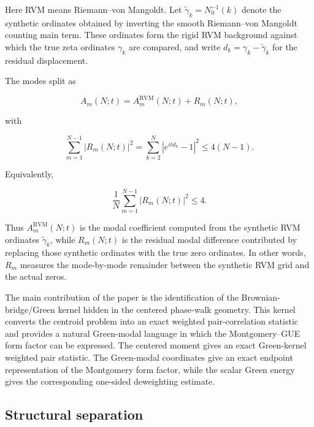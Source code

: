 \documentclass[11pt]{amsart}
\numberwithin{equation}{section}
\theoremstyle{plain}
\theoremstyle{definition}
\theoremstyle{remark}
\begin{document}
Here RVM means Riemann--von Mangoldt. Let
\(\widetilde\gamma_k=N_0^{-1}(k)\) denote the synthetic ordinates
obtained by inverting the smooth Riemann--von Mangoldt counting main
term. These ordinates form the rigid RVM background against which the
true zeta ordinates \(\gamma_k\) are compared, and write
\(d_k=\gamma_k-\widetilde\gamma_k\) for the residual displacement.

The modes split as

\begin{equation}
A_m(N;t)=A_m^{\mathrm{RVM}}(N;t)+R_m(N;t),
\label{eq:conclusion_rvm_modal_split}
\end{equation}

with

\begin{equation}
\sum_{m=1}^{N-1}|R_m(N;t)|^2
=
\sum_{k=2}^{N}|e^{itd_k}-1|^2
\le
4(N-1).
\label{eq:conclusion_rvm_residual_bound}
\end{equation}

Equivalently,

\begin{equation}
\frac1N
\sum_{m=1}^{N-1}|R_m(N;t)|^2
\le
4.
\label{eq:conclusion_rvm_residual_normalized_bound}
\end{equation}

Thus \(A_m^{\mathrm{RVM}}(N;t)\) is the modal coefficient computed from
the synthetic RVM ordinates \(\widetilde\gamma_k\), while \(R_m(N;t)\) is
the residual modal difference contributed by replacing those synthetic
ordinates with the true zero ordinates. In other words, \(R_m\) measures
the mode-by-mode remainder between the synthetic RVM grid and the actual
zeros.

The main contribution of the paper is the identification of the
Brownian-bridge/Green kernel hidden in the centered phase-walk geometry.
This kernel converts the centroid problem into an exact weighted
pair-correlation statistic and provides a natural Green-modal language
in which the Montgomery--GUE form factor can be expressed.
The centered moment gives an exact Green-kernel weighted pair statistic.
The Green-modal coordinates give an exact endpoint representation of the
Montgomery form factor, while the scalar Green energy gives the
corresponding one-sided deweighting estimate.

\subsection{Structural separation}
\label{subsec:conclusion_structural_separation}
\leavevmode\par\nobreak
\end{document}
